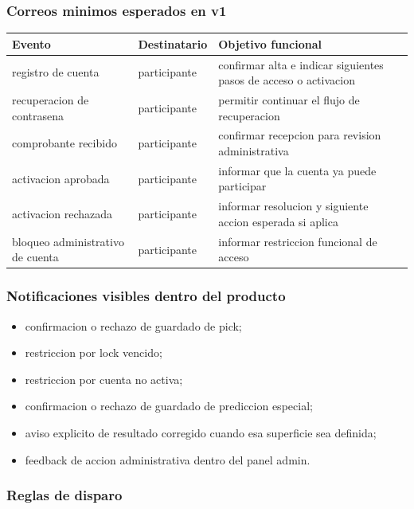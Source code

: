 \subsubsection{Correos minimos esperados en v1}

\begin{longtable}{p{}p{}p{}}
\toprule
\textbf{Evento} & \textbf{Destinatario} & \textbf{Objetivo funcional} \\
\midrule
registro de cuenta & participante & confirmar alta e indicar siguientes pasos de acceso o activacion \\
recuperacion de contrasena & participante & permitir continuar el flujo de recuperacion \\
comprobante recibido & participante & confirmar recepcion para revision administrativa \\
activacion aprobada & participante & informar que la cuenta ya puede participar \\
activacion rechazada & participante & informar resolucion y siguiente accion esperada si aplica \\
bloqueo administrativo de cuenta & participante & informar restriccion funcional de acceso \\
\bottomrule
\end{longtable}

\subsubsection{Notificaciones visibles dentro del producto}

\begin{itemize}
  \item confirmacion o rechazo de guardado de pick;
  \item restriccion por lock vencido;
  \item restriccion por cuenta no activa;
  \item confirmacion o rechazo de guardado de prediccion especial;
  \item aviso explicito de resultado corregido cuando esa superficie sea definida;
  \item feedback de accion administrativa dentro del panel admin.
\end{itemize}

\subsubsection{Reglas de disparo}

